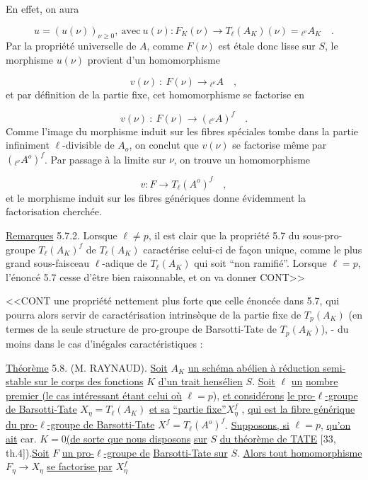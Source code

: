 En effet, on aura

\begin{equation}\tag{5.7.1}
u = (u(\nu))_{\nu \geqslant 0}, \ \mbox{avec} \ u(\nu): F_K(\nu) \longrightarrow T_\ell(A_K)(\nu) = {}_{\ell^\nu}A_K \quad .
\end{equation}
Par la propriété universelle de $A$, comme $F(\nu)$ est étale donc lisse sur $S$, le morphisme $u(\nu)$ provient d'un homomorphisme

\begin{equation*}
v(\nu) \ : \ F(\nu) \longrightarrow {}_{\ell^\nu}A \quad ,
\end{equation*}
et par définition de la partie fixe, cet homomorphisme se factorise en

\begin{equation*}
v(\nu) \ : \ F(\nu) \longrightarrow ({}_{\ell^\nu}A)^f \quad .
\end{equation*}
Comme l'image du morphisme induit sur les fibres spéciales tombe dans la partie infiniment $\ell$-divisible de $A_o$, on conclut que $v(\nu)$ se factorise même par $({}_{\ell^\nu}A^o)^f$. Par passage à la limite sur $\nu$, on trouve un homomorphisme

\begin{equation*}
v: F \longrightarrow T_\ell(A^o)^f \quad ,
\end{equation*}
et le morphisme induit sur les fibres génériques donne évidemment la factorisation cherchée.

\underline{Remarques} 5.7.2. Lorsque $\ell \neq p$, il est clair que la propriété 5.7 du sous-pro-groupe $T_\ell(A_K)^f$ de $T_\ell(A_K)$ caractérise celui-ci de façon unique, comme le plus grand sous-faisceau $\ell$-adique de $T_\ell(A_K)$ qui soit ``non ramifié''. Lorsque $\ell = p$, l'énoncé 5.7 cesse d'être bien raisonnable, et on va donner CONT>>



<<CONT une propriété nettement plus forte que celle énoncée dans 5.7, qui pourra alors servir de caractérisation intrinsèque de la partie fixe de $T_p(A_K)$ (en termes de la seule structure de pro-groupe de Barsotti-Tate de $T_p(A_K)$), - du moins dans le cas d'inégales caractéristiques :

\underline{Théorème} 5.8. (M. RAYNAUD). \underline{Soit} $A_K$ \underline{un schéma abélien à réduction semi-stable sur le corps des fonctions} $K$ \underline{d'un trait hensélien} $S$. \underline{Soit} $\ell$ \underline{un} \underline{nombre premier (le cas intéressant étant celui où} $\ell = p$), \underline{et considérons} \underline{le pro-$\ell$-groupe de Barsotti-Tate} $X_\eta = T_\ell(A_K)$ \underline{et sa} \underline{``partie fixe''}$X_\eta^f$ , \underline{qui est la fibre générique du pro-$\ell$-groupe de Barsotti-Tate} $X^f = T_\ell(A^o)^f$. \underline{Supposons, si} $\ell = p$, \underline{qu'on ait} car. $K = 0$\underline{(de sorte que nous disposons} \underline{sur} $S$ \underline{du théorème de TATE} [33, th.4]).\underline{Soit} $F$ \underline{un pro-$\ell$-groupe de} \underline{Barsotti-Tate sur} $S$. \underline{Alors tout homomorphisme} $F_\eta \longrightarrow X_\eta$ \underline{se factorise par} $X_\eta^f$

